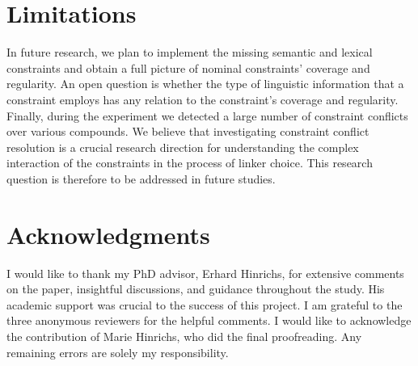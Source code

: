 \documentclass[10pt, a4paper]{article}
\newcommand{\zeroLinker}{\ensuremath{\boldsymbol{\varnothing}}}
\begin{document}



\section{Limitations}
\label{sec:lim}

In future research, we plan to implement the missing semantic and lexical constraints and obtain a full picture of nominal constraints' coverage and regularity. An open question is whether the type of linguistic information that a constraint employs has any relation to the constraint's coverage and regularity. Finally, during the experiment we detected a large number of constraint conflicts over various compounds. We believe that investigating constraint conflict resolution is a crucial research direction for understanding the complex interaction of the constraints in the process of linker choice. This research question is therefore to be addressed in future studies.



\section{Acknowledgments}

I would like to thank my PhD advisor, Erhard Hinrichs, for extensive comments on the paper, insightful discussions, and guidance throughout the study. His academic support was crucial to the success of this project. I am grateful to the three anonymous reviewers for the helpful comments. I would like to acknowledge the contribution of Marie Hinrichs, who did the final proofreading. Any remaining errors are solely my responsibility.
\end{document}
